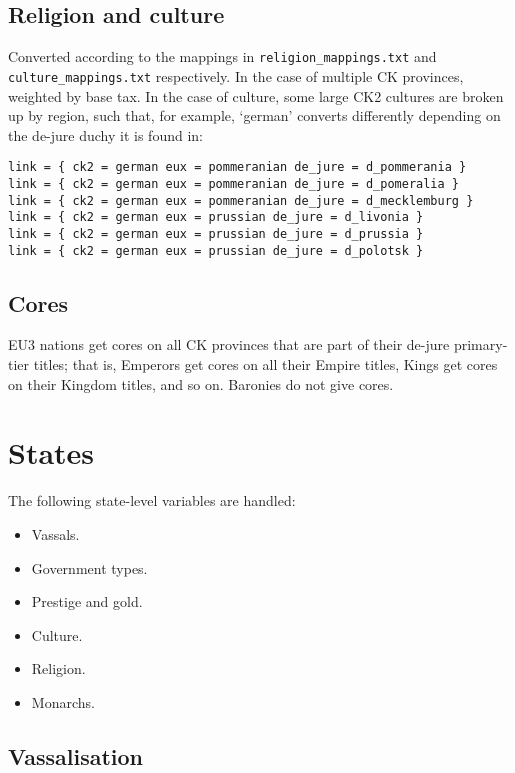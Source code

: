 \documentclass[12pt,ebook,oneside]{book}
\begin{document}
\section{Religion and culture}

\label{sec:provculture}

Converted according to the mappings in \verb|religion_mappings.txt|
and \verb|culture_mappings.txt| respectively. In the case of multiple
CK provinces, weighted by base tax. In the case of culture, some large
CK2 cultures are broken up by region, such that, for example, `german'
converts differently depending on the de-jure duchy it is found in:
\begin{verbatim}
link = { ck2 = german eux = pommeranian de_jure = d_pommerania }
link = { ck2 = german eux = pommeranian de_jure = d_pomeralia }
link = { ck2 = german eux = pommeranian de_jure = d_mecklemburg }
link = { ck2 = german eux = prussian de_jure = d_livonia }
link = { ck2 = german eux = prussian de_jure = d_prussia }
link = { ck2 = german eux = prussian de_jure = d_polotsk }
\end{verbatim} 

\section{Cores}

EU3 nations get cores on all CK provinces that are part of their
de-jure primary-tier titles; that is, Emperors get cores on all their
Empire titles, Kings get cores on their Kingdom titles, and so
on. Baronies do not give cores. 

\chapter{States}

The following state-level variables are handled:
\begin{itemize}
\item Vassals.
\item Government types. 
\item Prestige and gold. 
\item Culture. 
\item Religion. 
\item Monarchs. 
\end{itemize}

\section{Vassalisation}
\end{document}
